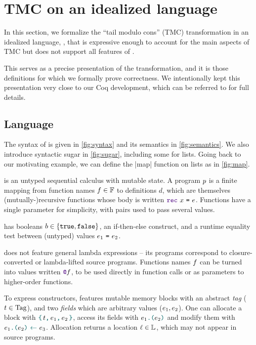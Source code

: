 \section{TMC on an idealized language}
\label{sec:formalization}

In this section, we formalize the ``tail modulo cons'' (TMC) transformation in an idealized language, \DataLang, that is expressive enough to account for the main aspects of TMC but does not support all features of \OCaml.

This serves as a precise presentation of the transformation, and it is those definitions for which we formally prove correctness. We intentionally kept this presentation very close to our Coq development, which can be referred to for full details.






\subsection{Language}

The syntax of \DataLang is given in \cref{fig:syntax} and its semantics in \cref{fig:semantics}.
We also introduce syntactic sugar in \cref{fig:sugar}, including some for lists.
Going back to our motivating example, we can define the \datalang|map| function on lists as in \cref{fig:map}.

\DataLang is an untyped sequential calculus with mutable state. A \DataLang program $\datalangProg$ is a finite mapping from function names $\datalangFn \in \datalangFn[]$ to definitions $d$, which are themselves (mutually-)recursive functions whose body is written $\datalangRec \datalangVar \datalangExpr$. Functions have a single parameter for simplicity, with pairs used to pass several values.

\DataLang has booleans $b \in \{\texttt{true}, \texttt{false}\}$, an if-then-else construct, and a runtime equality test between (untyped) values $\datalangEq{\datalangExpr_1}{\datalangExpr_2}$.

\DataLang does not feature general lambda expressions -- its programs correspond to closure-converted or lambda-lifted source programs. Functions names $\datalangFn$ can be turned into values written $\datalangFnptr{\datalangFn}$, to be used directly in function calls or as parameters to higher-order functions.

To express constructors, \DataLang features mutable memory blocks with an abstract \emph{tag} ($\datalangTag \in \datalangTag[]$), and two \emph{fields} which are arbitrary values ($\datalangExpr_1, \datalangExpr_2$).
One can allocate a block with $\datalangBlock{\datalangTag}{\datalangExpr_1}{\datalangExpr_2}$, access its fields with $\datalangLoad{\datalangExpr_1}{\datalangExpr_2}$ and modify them with $\datalangStore{\datalangExpr_1}{\datalangExpr_2}{\datalangExpr_3}$.
Allocation returns a location $\datalangLoc \in \datalangLoc[]$, which may not appear in source programs.

